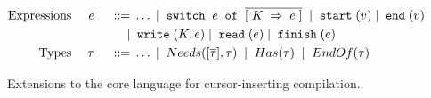 \begin{figure*}
  \begin{displaymath}
    \begin{aligned}
      \textup{Expressions} && \; {e} \; && 
     \; ::= \; & \ldots \; | \; \; \texttt{switch} \;\; e\; \; \texttt{of} \;\; \overline{[{\; {K} \;} \Rightarrow {\; {e} \;}]} \; 
     \; | \; \; \texttt{start} \;(v) \; | \; \; \texttt{end} \;(v)
      \\
      && && \; | \; & \; \texttt{write} \;(K,e) \; | \; \; \texttt{read} \;(e) \; | \;
      \; \texttt{finish} \;(e) \\      
      \textup{Types} && \; {\tau} \; && \; ::= \; & \ldots \; | \; \; Needs([\overline{\tau}],\tau) \; \; | \; \; Has(\tau) \; 
\; | \; \; EndOf(\tau) \; \\
    \end{aligned}
  \end{displaymath}
  \caption{Extensions to the core language for cursor-inserting compilation.}
  \label{fig:target}
\end{figure*}
